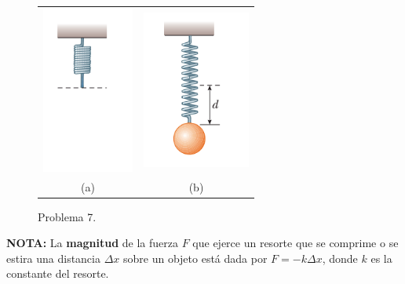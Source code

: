 \documentclass{article}
\begin{document}
\begin{enumerate}
\begin{figure}[H]
\centering
\begin{tabular}{cc}
\includegraphics[scale=0.5]{problema_7a.png} & \includegraphics[scale=0.5]{problema_7b.png}\\
(a) & (b)
\end{tabular}

\caption{Problema 7.}
\end{figure}

\textbf{NOTA:} La \textbf{magnitud} de la fuerza $F$ que ejerce un resorte que se comprime o se estira una distancia $\Delta x$ sobre un objeto está dada por $F=-k\Delta x$, donde $k$ es la constante del resorte. 

\end{enumerate}
\end{document}
